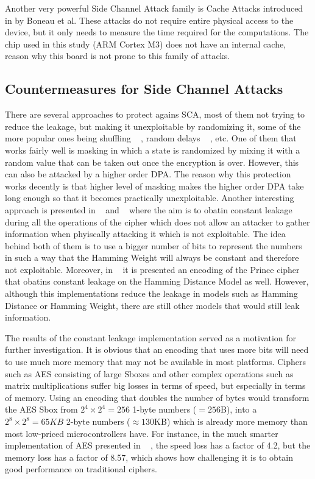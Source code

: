 \documentclass[conference]{IEEEtran}
\begin{document}
Another very powerful Side Channel Attack family is Cache Attacks introduced in \cite{Boneau} by Boneau et al. These attacks do not require entire physical access to the device, but it only needs to measure the time required for the computations. The chip used in this study (ARM Cortex M3) does not have an internal cache, reason why this board is not prone to this family of attacks.

\subsection{Countermeasures for Side Channel Attacks}

There are several approaches to protect agains SCA, most of them not trying to reduce the leakage, but making it unexploitable by randomizing it, some of the more popular ones being shuffling ~\cite{WangShuffling} , random delays ~\cite{CoronRandomDelays} , etc. One of them that works fairly well is masking in which a state is randomized by mixing it with a random value that can be taken out once the encryption is over. However, this can also be attacked by a higher order DPA. The reason why this protection works decently is that higher level of masking makes the higher order DPA take long enough so that it becomes practically unexploitable. Another interesting approach is presented in ~\cite{BEPrince} and ~\cite{ServantAES} where the aim is to obatin constant leakage during all the operations of the cipher which does not allow an attacker to gather information when phyiscally attacking it which is not exploitable. The idea behind both of them is to use a bigger number of bits to represent the numbers in such a way that the Hamming Weight will always be constant and therefore not exploitable. Moreover, in ~\cite{BEPrince} it is presented an encoding of the Prince cipher that obatins constant leakage on the Hamming Distance Model as well. However, although this implementations reduce the leakage in models such as Hamming Distance or Hamming Weight, there are still other models that would still leak information.

The results of the constant leakage implementation served as a motivation for further investigation. It is obvious that an encoding that uses more bits will need to use much more memory that may not be available in most platforms. Ciphers such as AES consisting of large Sboxes and other complex operations such as matrix multiplications suffer big losses in terms of speed, but especially in terms of memory. Using an encoding that doubles the number of bytes would transform the AES Sbox from $2^{4} \times 2^{4} = 256$ 1-byte numbers ($=256$B), into a $2^{8} \times 2^{8} = 65KB$ 2-byte numbers ($\approx130$KB) which is already more memory than most low-priced microcontrollers have. For instance, in the much smarter implementation of AES presented in ~\cite{ServantAES} , the speed loss has a factor of 4.2, but the memory loss has a factor of 8.57, which shows how challenging it is to obtain good performance on traditional ciphers.
\end{document}
